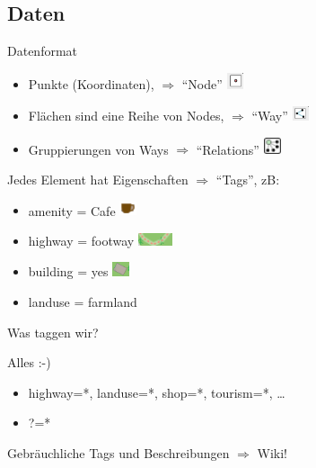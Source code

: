 \documentclass{beamer}
\begin{document}
\subsection{Daten}
\begin{frame}{Datenformat}

\begin{itemize}
  \item Punkte (Koordinaten), $\Rightarrow$ ``Node'' \includegraphics[width=0.5cm]{node.png}
  \item Flächen sind eine Reihe von Nodes, $\Rightarrow$ ``Way'' \includegraphics[width=0.5cm]{way.png}
  \item Gruppierungen von Ways $\Rightarrow$ ``Relations'' \includegraphics[width=0.5cm]{relation.png}
\end{itemize}

\pause

Jedes Element hat Eigenschaften $\Rightarrow$ ``Tags'', zB:
\begin{itemize}
  \item amenity = Cafe \includegraphics[width=0.5cm]{cafe.png}
  \item highway = footway \includegraphics[width=1cm]{footway.png}
  \item building = yes  \includegraphics[width=0.5cm]{building.png}
  \item landuse = farmland 
\end{itemize}

\pause

Was taggen wir?

\pause

Alles :-)

\begin{itemize}
  \item highway=*, landuse=*, shop=*, tourism=*, \dots
  \item ?=*
\end{itemize}

Gebräuchliche Tags und Beschreibungen $\Rightarrow$ Wiki!

\end{frame}
\end{document}
